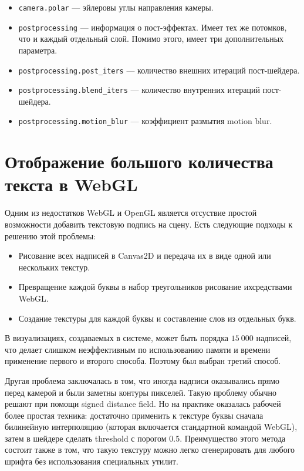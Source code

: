 \begin{itemize}
\item \texttt{camera.polar} --- эйлеровы углы направления камеры.
\item \texttt{postprocessing} --- информация о пост-эффектах. Имеет тех же потомков, что и каждый отдельный слой. Помимо этого, имеет три дополнительных параметра.
\item \texttt{postprocessing.post\_iters} --- количество внешних итераций пост-шейдера. 
\item \texttt{postprocessing.blend\_iters} --- количество внутренних итераций пост-шейдера.
\item \texttt{postprocessing.motion\_blur} --- коэффициент размытия motion blur.
\end{itemize}

\section{Отображение большого количества текста в WebGL}

Одним из недостатков WebGL и OpenGL является отсуствие простой возможности добавить текстовую подпись на сцену. Есть следующие подходы к решению этой проблемы:

\begin{itemize}
\item Рисование всех надписей в Canvas2D и передача их в виде одной или нескольких текстур.
\item Превращение каждой буквы в набор треугольников рисование ихсредствами WebGL.
\item Создание текстуры для каждой буквы и составление слов из отдельных букв.
\end{itemize}

В визуализациях, создаваемых в системе, может быть порядка $15\ 000$ надписей, что делает слишком неэффективным по использованию памяти и времени применение первого и второго способа. Поэтому был выбран третий способ.

Другая проблема заключалась в том, что иногда надписи оказывались прямо перед камерой и были заметны контуры пикселей. Такую проблему обычно решают при помощи signed distance field. Но на практике оказалась рабочей более простая техника: достаточно применить к текстуре буквы сначала билинейную интерполяцию (которая включается стандартной командой WebGL), затем в шейдере сделать threshold с порогом 0.5. Преимущество этого метода состоит также в том, что такую текстуру можно легко сгенерировать для любого шрифта без использования специальных утилит.

